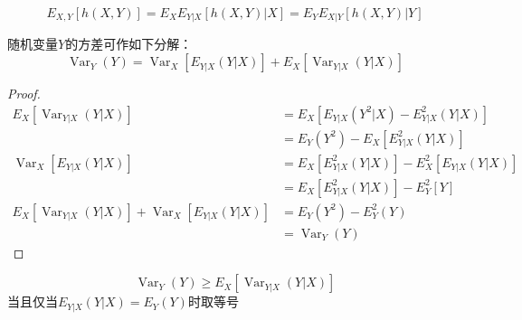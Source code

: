 \begin{proposition}[联合期望公式]
    \[ E_{X,Y}[h(X,Y)]=E_X E_{Y|X}[h(X,Y)|X] = E_Y E_{X|Y}[h(X,Y)|Y] \]
\end{proposition}

\begin{theorem}[重方差公式]\label{thm:var_dec}
    随机变量$Y$的方差可作如下分解：
    \[ \operatorname{Var}_Y(Y)=\operatorname{Var}_X[E_{Y|X}(Y|X)] + E_X[\operatorname{Var}_{Y|X}(Y|X)] \]
\end{theorem}
\begin{proof}
    \begin{align*}
        E_X[\operatorname{Var}_{Y|X}(Y|X)]                                      & = E_X[E_{Y|X}(Y^2|X)-E^2_{Y|X}(Y|X)]        \\
                                                                                & = E_Y(Y^2) - E_X[E^2_{Y|X}(Y|X)]            \\
        \operatorname{Var}_X[E_{Y|X}(Y|X)]                                      & = E_X[E^2_{Y|X}(Y|X)] - E^2_X[E_{Y|X}(Y|X)] \\
                                                                                & = E_X[E^2_{Y|X}(Y|X)] - E^2_Y[Y]            \\
        E_X[\operatorname{Var}_{Y|X}(Y|X)] + \operatorname{Var}_X[E_{Y|X}(Y|X)] & = E_Y(Y^2) - E^2_Y(Y)                       \\
                                                                                & = \operatorname{Var}_Y(Y)
    \end{align*}
\end{proof}


\begin{corollary}
    \[ \operatorname{Var}_Y(Y) \ge E_X[\operatorname{Var}_{Y|X}(Y|X)] \]
    当且仅当$E_{Y|X}(Y|X)=E_Y(Y)$时取等号
\end{corollary}

